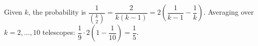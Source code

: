 Given $k$, the probability is $\dfrac1{\binom k2}=\dfrac2{k(k-1)}=2\left(\dfrac1{k-1}-\dfrac1k\right)$. Averaging over $k=2,\dots,10$ telescopes: $\dfrac19\cdot2\left(1-\dfrac1{10}\right)=\boxed{\dfrac15}$.

